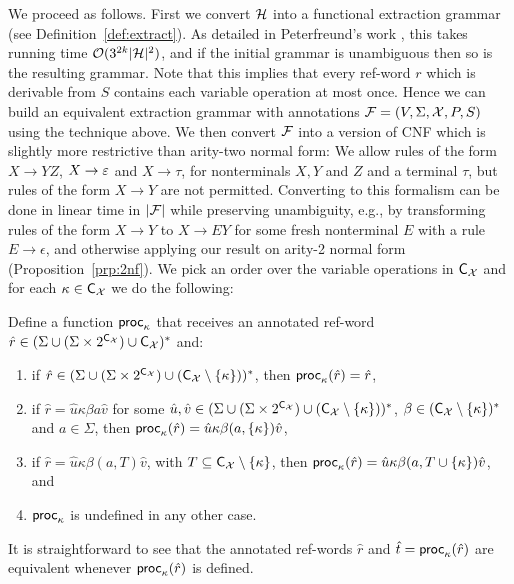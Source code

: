 We proceed as follows. First we convert $\mathcal{H}$ into a functional extraction grammar (see Definition~\ref{def:extract}).
As detailed in Peterfreund's work
\cite[Propositions 10 and 12]{Peterfreund21}, this takes running time 
$\mathcal{O}(3^{2k}|\mathcal{H}|^2)$, and if the initial grammar is unambiguous then so is
the resulting grammar.
Note that this implies that every ref-word $r$ which is derivable from $S$ contains each variable operation at most once. Hence we can build an equivalent extraction grammar with annotations $\mathcal{F} = (V, \Sigma, \mathcal{X}, P, S)$ using the technique above. We then convert $\mathcal{F}$ into a version of CNF which is slightly more restrictive than arity-two normal form: We allow rules of the form $X\to YZ$, $X\to \varepsilon$ and $X\to \tau$, for nonterminals $X, Y$ and $Z$ and a terminal $\tau$, but rules of the form $X\to Y$ are not permitted.
Converting to this formalism can be done in linear time in $|\mathcal{F}|$ while preserving unambiguity,
%
e.g., by transforming rules of the form $X \rightarrow Y$ to $X \rightarrow E Y$
for some fresh nonterminal $E$ with a rule $E \rightarrow \epsilon$, and
otherwise applying our result on arity-2 normal form (Proposition~\ref{prp:2nf}).
We pick an order over the variable operations in $\textsf{C}_{\mathcal{X}}$ and for each $\kappa\in\textsf{C}_{\mathcal{X}}$ we do the following:

Define a function $\mathsf{proc}_{\kappa}$ that receives an annotated ref-word
$\hat{r}\in (\Sigma \cup (\Sigma\times2^{\textsf{C}_{\mathcal{X}}}) \cup
\textsf{C}_{\mathcal{X}})^*$ and:
\begin{enumerate}
  \item if $\hat{r}\in (\Sigma \cup (\Sigma\times2^{\textsf{C}_{\mathcal{X}}}) \cup (\textsf{C}_{\mathcal{X}}\setminus\{\kappa\}))^*$, then $\mathsf{proc}_{\kappa}(\hat{r}) = \hat{r}$,
  \item if $\hat{r} = \hat{u}\kappa \beta a\hat{v}$ for some $\hat{u}, \hat{v}\in (\Sigma \cup (\Sigma\times2^{\textsf{C}_{\mathcal{X}}}) \cup (\textsf{C}_{\mathcal{X}}\setminus\{\kappa\}))^*$, $\beta\in (\textsf{C}_{\mathcal{X}}\setminus\{\kappa\})^*$ and $a\in\Sigma$, then $\mathsf{proc}_{\kappa}(\hat{r}) = \hat{u}\kappa \beta (a,\{\kappa\})\hat{v}$,
  \item if $\hat{r} = \hat{u}\kappa \beta (a,T)\hat{v}$, with $T\subseteq\textsf{C}_{\mathcal{X}}\setminus\{\kappa\}$, then  $\mathsf{proc}_{\kappa}(\hat{r}) = \hat{u}\kappa \beta (a,T\cup\{\kappa\})\hat{v}$, and
  \item $\mathsf{proc}_{\kappa}$ is undefined in any other case.
\end{enumerate}
It is straightforward to see that the annotated ref-words $\hat{r}$ and $\hat{t} = \mathsf{proc}_\kappa(\hat{r})$ are equivalent whenever $\mathsf{proc}_\kappa(\hat{r})$ is defined.\\


